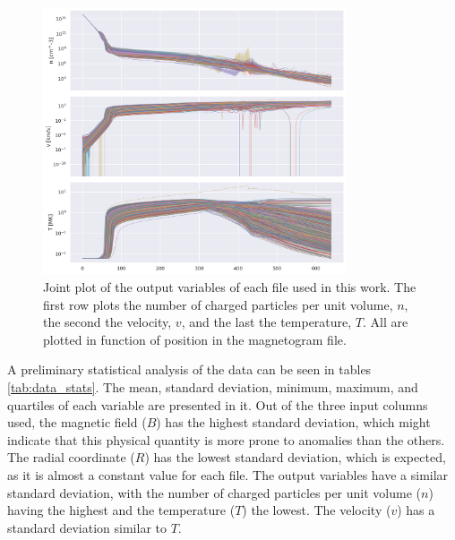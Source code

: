 \begin{figure}
    \centering
    \includegraphics[width=0.8\textwidth]{figures/joint_output_cols.png}
    \caption[Joint plot of the outputs of MULTI-VP]{Joint plot of the output variables of each file used in this work. The first row plots the number of charged particles per unit volume, $n$, the second the velocity, $v$, and the last the temperature, $T$. All are plotted in function of position in the magnetogram file.}
    \label{fig:jointplot_output}
\end{figure}

A preliminary statistical analysis of the data can be seen in tables \ref{tab:data_stats}. The mean, standard deviation, minimum, maximum, and quartiles of each variable are presented in it. Out of the three input columns used, the magnetic field ($B$) has the highest standard deviation, which might indicate that this physical quantity is more prone to anomalies than the others. The radial coordinate ($R$) has the lowest standard deviation, which is expected, as it is almost a constant value for each file. The output variables have a similar standard deviation, with the number of charged particles per unit volume ($n$) having the highest and the temperature ($T$) the lowest. The velocity ($v$) has a standard deviation similar to $T$.

